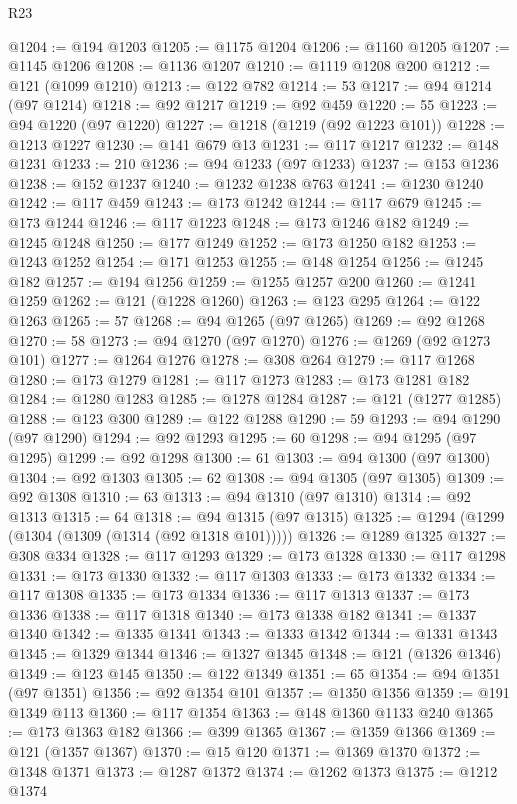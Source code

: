 \begin{lexlean}{R23}
\begin{coremodule}
@1204 := @194 @1203
@1205 := @1175 @1204
@1206 := @1160 @1205
@1207 := @1145 @1206
@1208 := @1136 @1207
@1210 := @1119 @1208 @200
@1212 := @121 (@1099 @1210)
@1213 := @122 @782
@1214 := 53
@1217 := @94 @1214 (@97 @1214)
@1218 := @92 @1217
@1219 := @92 @459
@1220 := 55
@1223 := @94 @1220 (@97 @1220)
@1227 := @1218 (@1219 (@92 @1223 @101))
@1228 := @1213 @1227
@1230 := @141 @679 @13
@1231 := @117 @1217
@1232 := @148 @1231
@1233 := 210
@1236 := @94 @1233 (@97 @1233)
@1237 := @153 @1236
@1238 := @152 @1237
@1240 := @1232 @1238 @763
@1241 := @1230 @1240
@1242 := @117 @459
@1243 := @173 @1242
@1244 := @117 @679
@1245 := @173 @1244
@1246 := @117 @1223
@1248 := @173 @1246 @182
@1249 := @1245 @1248
@1250 := @177 @1249
@1252 := @173 @1250 @182
@1253 := @1243 @1252
@1254 := @171 @1253
@1255 := @148 @1254
@1256 := @1245 @182
@1257 := @194 @1256
@1259 := @1255 @1257 @200
@1260 := @1241 @1259
@1262 := @121 (@1228 @1260)
@1263 := @123 @295
@1264 := @122 @1263
@1265 := 57
@1268 := @94 @1265 (@97 @1265)
@1269 := @92 @1268
@1270 := 58
@1273 := @94 @1270 (@97 @1270)
@1276 := @1269 (@92 @1273 @101)
@1277 := @1264 @1276
@1278 := @308 @264
@1279 := @117 @1268
@1280 := @173 @1279
@1281 := @117 @1273
@1283 := @173 @1281 @182
@1284 := @1280 @1283
@1285 := @1278 @1284
@1287 := @121 (@1277 @1285)
@1288 := @123 @300
@1289 := @122 @1288
@1290 := 59
@1293 := @94 @1290 (@97 @1290)
@1294 := @92 @1293
@1295 := 60
@1298 := @94 @1295 (@97 @1295)
@1299 := @92 @1298
@1300 := 61
@1303 := @94 @1300 (@97 @1300)
@1304 := @92 @1303
@1305 := 62
@1308 := @94 @1305 (@97 @1305)
@1309 := @92 @1308
@1310 := 63
@1313 := @94 @1310 (@97 @1310)
@1314 := @92 @1313
@1315 := 64
@1318 := @94 @1315 (@97 @1315)
@1325 := @1294 (@1299 (@1304 (@1309 (@1314 (@92 @1318 @101)))))
@1326 := @1289 @1325
@1327 := @308 @334
@1328 := @117 @1293
@1329 := @173 @1328
@1330 := @117 @1298
@1331 := @173 @1330
@1332 := @117 @1303
@1333 := @173 @1332
@1334 := @117 @1308
@1335 := @173 @1334
@1336 := @117 @1313
@1337 := @173 @1336
@1338 := @117 @1318
@1340 := @173 @1338 @182
@1341 := @1337 @1340
@1342 := @1335 @1341
@1343 := @1333 @1342
@1344 := @1331 @1343
@1345 := @1329 @1344
@1346 := @1327 @1345
@1348 := @121 (@1326 @1346)
@1349 := @123 @145
@1350 := @122 @1349
@1351 := 65
@1354 := @94 @1351 (@97 @1351)
@1356 := @92 @1354 @101
@1357 := @1350 @1356
@1359 := @191 @1349 @113
@1360 := @117 @1354
@1363 := @148 @1360 @1133 @240
@1365 := @173 @1363 @182
@1366 := @399 @1365
@1367 := @1359 @1366
@1369 := @121 (@1357 @1367)
@1370 := @15 @120
@1371 := @1369 @1370
@1372 := @1348 @1371
@1373 := @1287 @1372
@1374 := @1262 @1373
@1375 := @1212 @1374

\end{coremodule}
\end{lexlean}
